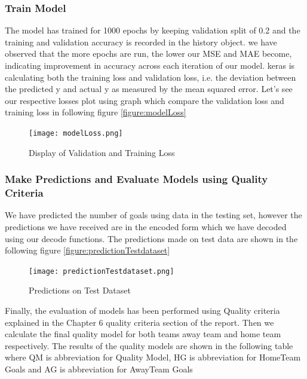 \subsubsection{Train Model}
The model has trained for 1000 epochs by keeping validation split of 0.2 and the training and validation accuracy is recorded in the history object.
we have observed that the more epochs are run, the lower our MSE and MAE become, indicating improvement in accuracy across each iteration of our model.\newline
keras is calculating both the training loss and validation loss, i.e. the deviation between the predicted y and actual y as measured by the mean squared error. Let’s see our respective losses plot using graph which compare the validation loss and training loss in following figure \autoref{figure:modelLoss} \newline
\begin{figure}[H]
\begin{center}
\texttt{[image: modelLoss.png]}
\end{center}
\caption{Display of Validation and Training Loss }
\label{figure:modelLoss}
\end{figure}
\subsubsection{Make Predictions and Evaluate Models using Quality Criteria }
We have predicted the number of goals using data in the testing set, however the predictions we have received are in the encoded form which we have decoded using our decode functions. The predictions made on test data are shown in the following figure \autoref{figure:predictionTestdataset} \newline
\begin{figure}[H]
\begin{center}
\texttt{[image: predictionTestdataset.png]}
\end{center}
\caption{Predictions on Test Dataset }
\label{figure:predictionTestdataset}
\end{figure}
Finally, the evaluation of models has been performed using Quality criteria explained in the Chapter 6 quality criteria section of the report. Then we calculate the final quality model for both teams away team and home team respectively. The results of the quality models are shown in the following table where QM is abbreviation for Quality Model, HG is abbreviation for HomeTeam Goals and AG is abbreviation for AwayTeam Goals\newline

